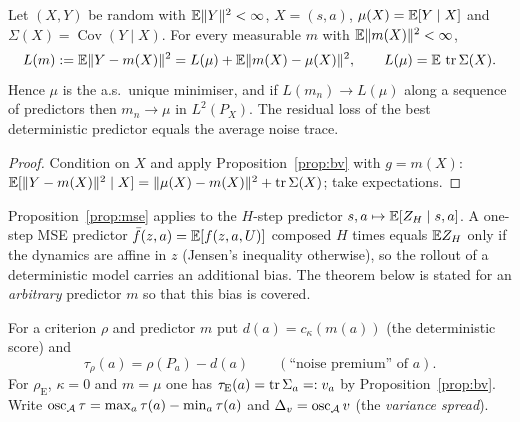 \begin{proposition}\label{prop:mse}
Let $(X,Y)$ be random with $\mathbb{E}\|Y\|^2<\infty$, $X=(s,a)$, $\mu(X)=\mathbb{E}[Y\mid X]$ and $\Sigma(X)=\operatorname{Cov}(Y\mid X)$.
For every measurable $m$ with $\mathbb{E}\|m(X)\|^2<\infty$,
\[
L(m):=\mathbb{E}\|Y-m(X)\|^2=L(\mu)+\mathbb{E}\|m(X)-\mu(X)\|^2,\qquad L(\mu)=\mathbb{E}\,\operatorname{tr}\Sigma(X).
\]
Hence $\mu$ is the a.s.\ unique minimiser, and if $L(m_n)\to L(\mu)$ along a sequence of predictors then $m_n\to\mu$ in $L^2(P_X)$.
The residual loss of the best deterministic predictor equals the average noise trace.
\end{proposition}
\begin{proof}
Condition on $X$ and apply Proposition~\ref{prop:bv} with $g=m(X)$: $\mathbb{E}[\|Y-m(X)\|^2\mid X]=\|\mu(X)-m(X)\|^2+\operatorname{tr}\Sigma(X)$; take expectations.
\end{proof}

\begin{remark}\label{rem:multistep}
Proposition~\ref{prop:mse} applies to the $H$-step predictor $s,a\mapsto \mathbb{E}[Z_H\mid s,a]$.
A one-step MSE predictor $\bar f(z,a)=\mathbb{E}[f(z,a,U)]$ composed $H$ times equals $\mathbb{E} Z_H$ only if the dynamics are affine in $z$ (Jensen's inequality otherwise), so the rollout of a deterministic model carries an additional bias.
The theorem below is stated for an \emph{arbitrary} predictor $m$ so that this bias is covered.
\end{remark}

\begin{definition}\label{def:premium}
For a criterion $\rho$ and predictor $m$ put $d(a)=c_\kappa(m(a))$ (the deterministic score) and
\[
\tau_\rho(a)=\rho(P_a)-d(a)\qquad(\text{``noise premium'' of }a).
\]
For $\rho_{\mathrm E}$, $\kappa=0$ and $m=\mu$ one has $\tau_{\mathrm E}(a)=\operatorname{tr}\Sigma_a=:v_a$ by Proposition~\ref{prop:bv}.
Write $\operatorname{osc}_{\mathcal A}\tau=\max_a\tau(a)-\min_a\tau(a)$ and $\Delta_v=\operatorname{osc}_{\mathcal A}v$ (the \emph{variance spread}).
\end{definition}

